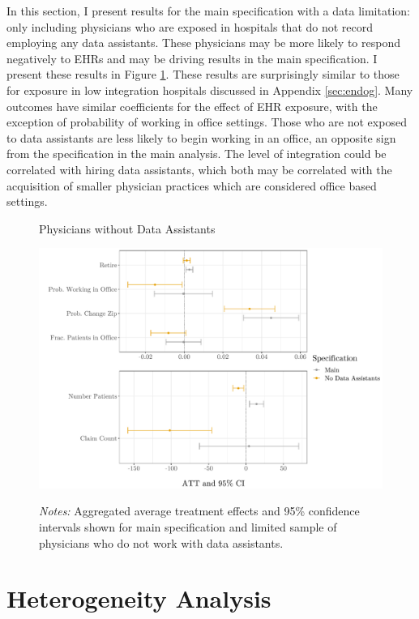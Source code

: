 \documentclass[12pt]{article}
\begin{document}
In this section, I present results for the main specification with a data limitation: only including physicians who are exposed in hospitals that do not record employing any data assistants. These physicians may be more likely to respond negatively to EHRs and may be driving results in the main specification. I present these results in Figure \ref{fig:DA}. These results are surprisingly similar to those for exposure in low integration hospitals discussed in Appendix \ref{sec:endog}. Many outcomes have similar coefficients for the effect of EHR exposure, with the exception of probability of working in office settings. Those who are not exposed to data assistants are less likely to begin working in an office, an opposite sign from the specification in the main analysis. The level of integration could be correlated with hiring data assistants, which both may be correlated with the acquisition of smaller physician practices which are considered office based settings.

\begin{figure}[ht]
    \centering
    \captionsetup{width=.57\linewidth}
    \caption{Physicians without Data Assistants}
    \includegraphics[scale=.57]{Objects/DA_graph.pdf}
    \label{fig:DA}
    \vspace{2mm}
    \caption*{\footnotesize{\textit{Notes:} Aggregated average treatment effects and 95\% confidence intervals shown for main specification and limited sample of physicians who do not work with data assistants.}}
\end{figure}



\section{Heterogeneity Analysis}
\end{document}
